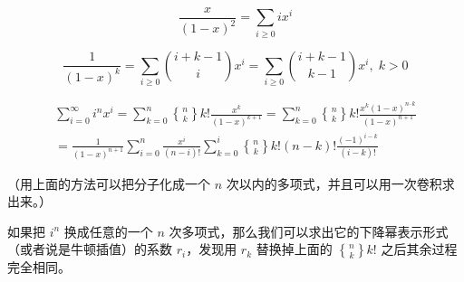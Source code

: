 $$ \frac x {(1 - x) ^ 2} = \sum_{i \ge 0} i x ^ i $$

$$ \frac 1 {(1 - x) ^ k} = \sum_{i \ge 0} {i + k - 1 \choose i} x ^ i = \sum_{i \ge 0} {i + k - 1 \choose k - 1}x^i, \; k > 0 $$

$$ \begin{aligned}
\sum_{i = 0} ^ \infty i^n x^i = \sum_{k = 0} ^ n {n \brace k} k! \frac {x^k} {(1-x) ^ {k + 1}} = \sum_{k = 0} ^ n {n \brace k} k! \frac {x^k (1-x) ^ {n – k}} {(1-x) ^ {n + 1}} \\
= \frac 1 {(1-x) ^ {n + 1}} \sum_{i = 0} ^ n \frac {x^i} {(n-i)!} \sum_{k = 0} ^ i {n \brace k}k!(n-k)! \frac {(-1)^{i-k}} {(i-k)!}
\end{aligned} $$

（用上面的方法可以把分子化成一个 $n$ 次以内的多项式，并且可以用一次卷积求出来。）

如果把 $i^n$ 换成任意的一个 $n$ 次多项式，那么我们可以求出它的下降幂表示形式（或者说是牛顿插值）的系数 $r_i$，发现用 $r_k$ 替换掉上面的 ${n \brace k}k!$ 之后其余过程完全相同。
